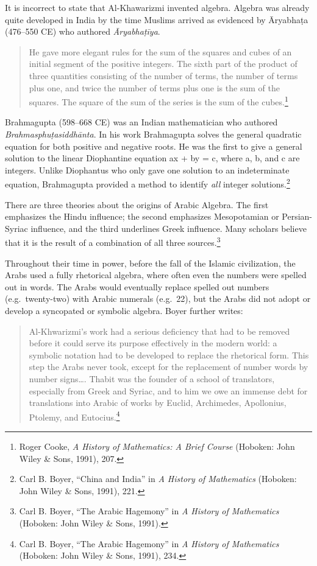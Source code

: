 It is incorrect to state that Al-Khawarizmi invented algebra. Algebra was already quite developed in India by the time Muslims arrived as evidenced by Āryabhaṭa (476–550 CE) who authored \textit{Āryabhaṭīya}. 
\begin{quote}
He gave more elegant rules for the sum of the squares and cubes of an initial segment of the positive integers. The sixth part of the product of three quantities consisting of the number of terms, the number of terms plus one, and twice the number of terms plus one is the sum of the squares. The square of the sum of the series is the sum of the cubes.\footnote{Roger Cooke, \textit{A History of Mathematics: A Brief Course} (Hoboken: John Wiley \& Sons, 1991), 207.}
\end{quote}
Brahmagupta (598--668 CE) was an Indian mathematician who authored \textit{Brahmasphuṭasiddhānta}. In his work Brahmagupta solves the general quadratic equation for both positive and negative roots. He was the first to give a general solution to the linear Diophantine equation ax + by = c, where a, b, and c are integers. Unlike Diophantus who only gave one solution to an indeterminate equation, Brahmagupta provided a method to identify \textit{all} integer solutions.\footnote{Carl B. Boyer, “China 	and India” in \textit{A History of Mathematics}  (Hoboken: John Wiley \& Sons, 1991), 221.}

There are three theories about the origins of Arabic Algebra. The first emphasizes the Hindu influence; the second emphasizes Mesopotamian or Persian-Syriac influence, and the third underlines Greek influence. Many scholars believe that it is the result of a combination of all three sources.\footnote{Carl B. Boyer, “The 	Arabic Hagemony” in \textit{A History of Mathematics} (Hoboken: John Wiley \& Sons, 1991).} 

Throughout their time in power, before the fall of the Islamic civilization, the Arabs used a fully rhetorical algebra, where often even the numbers were spelled out in words. The Arabs would eventually replace spelled out numbers (e.g.\ twenty-two) with Arabic numerals (e.g.\ 22), but the Arabs did not adopt or develop a syncopated or symbolic algebra. Boyer further writes:
\begin{quote}
Al-Khwarizmi's work had a serious deficiency that had to be removed before it could serve its purpose effectively in the modern world: a symbolic notation had to be developed to replace the rhetorical form. This step the Arabs never took, except for the replacement of number words by number signs…. Thabit was the founder of a school of translators, especially from Greek and Syriac, and to him we owe an immense debt for translations into Arabic of works by Euclid, Archimedes, Apollonius, Ptolemy, and Eutocius.\footnote{Carl B. Boyer, “The Arabic Hagemony” in \textit{A History of Mathematics} (Hoboken: John Wiley \& Sons, 1991), 234.}
\end{quote}
